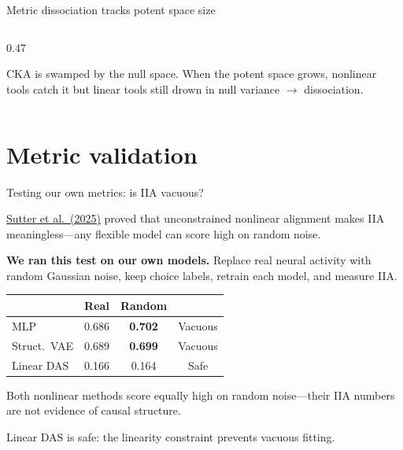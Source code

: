 \documentclass[aspectratio=169,11pt]{beamer}
\begin{document}
\begin{frame}{Metric dissociation tracks potent space size}
\begin{columns}[T]
\begin{column}{0.47\textwidth}

\vspace{0.3em}
{\small CKA is swamped by the null space. When the potent space grows, nonlinear tools catch it but linear tools still drown in null variance $\to$ dissociation.}
\end{column}
\end{columns}
\end{frame}

\section{Metric validation}

\begin{frame}{Testing our own metrics: is IIA vacuous?}

\href{https://arxiv.org/abs/2501.02043}{Sutter et al.\ (2025)} proved that unconstrained nonlinear alignment makes IIA meaningless---any flexible model can score high on random noise.

\vspace{0.5em}
\textbf{We ran this test on our own models.} Replace real neural activity with random Gaussian noise, keep choice labels, retrain each model, and measure IIA.

\vspace{0.5em}
\centering
{\small
\begin{tabular}{lccc}
\toprule
 & \textbf{Real} & \textbf{Random} & \\
\midrule
MLP & 0.686 & \textcolor{fail}{\textbf{0.702}} & \textcolor{fail}{Vacuous} \\
Struct.\ VAE & 0.689 & \textcolor{fail}{\textbf{0.699}} & \textcolor{fail}{Vacuous} \\
Linear DAS & 0.166 & \textcolor{pass}{0.164} & \textcolor{pass}{Safe} \\
\bottomrule
\end{tabular}
}

\vspace{0.5em}
\begin{flushleft}
Both nonlinear methods score equally high on random noise---their IIA numbers are not evidence of causal structure.

Linear DAS is safe: the linearity constraint prevents vacuous fitting.
\end{flushleft}
\end{frame}
\end{document}
